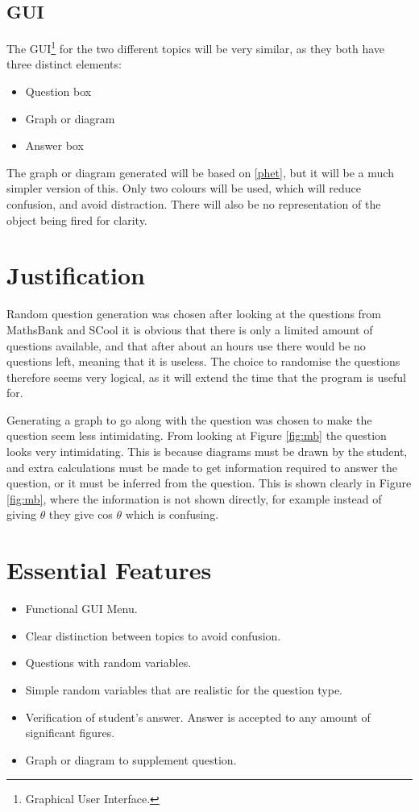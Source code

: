 \subsection{GUI}
The GUI\footnote{Graphical User Interface.} for the two different topics will be very similar, as they both have three distinct elements:	
\begin{itemize}
	\item{Question box}
	\item{Graph or diagram}
	\item{Answer box} 
\end{itemize}
The graph or diagram generated will be based on \ref{phet}, but it will be a much simpler version of this. Only two colours will be used, which will reduce confusion, and avoid distraction. There will also be no representation of the object being fired for clarity.
\section{Justification}
Random question generation was chosen after looking at the questions from MathsBank \autocite{mb} and SCool \autocite{scool} it is obvious that there is only a limited amount of questions available, and that after about an hours use there would be no questions left, meaning that it is useless. The choice to randomise the questions therefore seems very logical, as it will extend the time that the program is useful for.

Generating a graph to go along with the question was chosen to make the question seem less intimidating. From looking at Figure \ref{fig:mb} the question looks very intimidating. This is because diagrams must be drawn by the student, and extra calculations must be made to get information required to answer the question, or it must be inferred from the question. This is shown clearly in Figure \ref{fig:mb}, where the information is not shown directly, for example instead of giving $\theta$ they give cos $\theta$ which is confusing.
\section{Essential Features}
\begin{itemize}
	\item{Functional GUI Menu.}
	\item{Clear distinction between topics to avoid confusion.}
	\item{Questions with random variables.}
	\item{Simple random variables that are realistic for the question type.}
	\item{Verification of student's answer. Answer is accepted to any amount of significant figures.}
	\item{Graph or diagram to supplement question.}
\end{itemize}
